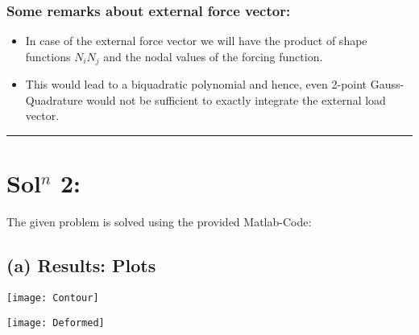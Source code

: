 \documentclass[11pt]{article}
\begin{document}
\subsubsection*{Some remarks about external force vector:}
\begin{itemize}
\item In case of the external force vector we will have the product of shape functions $N_i N_j$ and the nodal values of the forcing function.
\item This would lead to a biquadratic polynomial and hence, even 2-point Gauss-Quadrature would not be sufficient to exactly integrate the external load vector. 
\end{itemize} \hrule
\newpage 
\section*{Sol$^n$ 2: }
The given problem is solved using the provided Matlab-Code: 
\subsection*{(a) Results: Plots}
\begin{center}
\texttt{[image: Contour]} \nonumber
\end{center}
\label{Deformed geometry}
\begin{center}
\texttt{[image: Deformed]} \nonumber
\end{center}
\label{Contour}
\newpage
\end{document}

